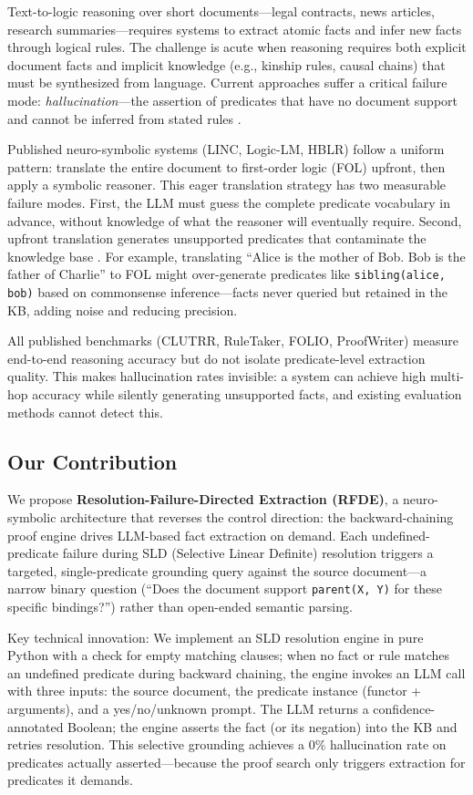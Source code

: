 \documentclass[11pt,letterpaper]{article}
\begin{document}
Text-to-logic reasoning over short documents---legal contracts, news articles, research
summaries---requires systems to extract atomic facts and infer new facts through logical rules.
The challenge is acute when reasoning requires both explicit document facts and implicit
knowledge (e.g., kinship rules, causal chains) that must be synthesized from language. Current
approaches suffer a critical failure mode: \emph{hallucination}---the assertion of predicates
that have no document support and cannot be inferred from stated rules
\citep{Olausson2023}.

Published neuro-symbolic systems (LINC, Logic-LM, HBLR) follow a uniform pattern: translate
the entire document to first-order logic (FOL) upfront, then apply a symbolic reasoner. This
eager translation strategy has two measurable failure modes. First, the LLM must guess the
complete predicate vocabulary in advance, without knowledge of what the reasoner will
eventually require. Second, upfront translation generates unsupported predicates that
contaminate the knowledge base \citep{Olausson2023}. For example, translating ``Alice is the
mother of Bob. Bob is the father of Charlie'' to FOL might over-generate predicates like
\texttt{sibling(alice, bob)} based on commonsense inference---facts never queried but retained
in the KB, adding noise and reducing precision.

All published benchmarks (CLUTRR, RuleTaker, FOLIO, ProofWriter) measure end-to-end
reasoning accuracy but do not isolate predicate-level extraction quality. This makes
hallucination rates invisible: a system can achieve high multi-hop accuracy while silently
generating unsupported facts, and existing evaluation methods cannot detect this.

\subsection{Our Contribution}

We propose \textbf{Resolution-Failure-Directed Extraction (RFDE)}, a neuro-symbolic
architecture that reverses the control direction: the backward-chaining proof engine drives
LLM-based fact extraction on demand. Each undefined-predicate failure during SLD (Selective
Linear Definite) resolution triggers a targeted, single-predicate grounding query against the
source document---a narrow binary question (``Does the document support
\texttt{parent(X,~Y)} for these specific bindings?'') rather than open-ended semantic
parsing.

Key technical innovation: We implement an SLD resolution engine in pure Python with a check
for empty matching clauses; when no fact or rule matches an undefined predicate during backward
chaining, the engine invokes an LLM call with three inputs: the source document, the predicate
instance (functor + arguments), and a yes/no/unknown prompt. The LLM returns a
confidence-annotated Boolean; the engine asserts the fact (or its negation) into the KB and
retries resolution. This selective grounding achieves a 0\% hallucination rate on predicates
actually asserted---because the proof search only triggers extraction for predicates it
demands.
\end{document}
